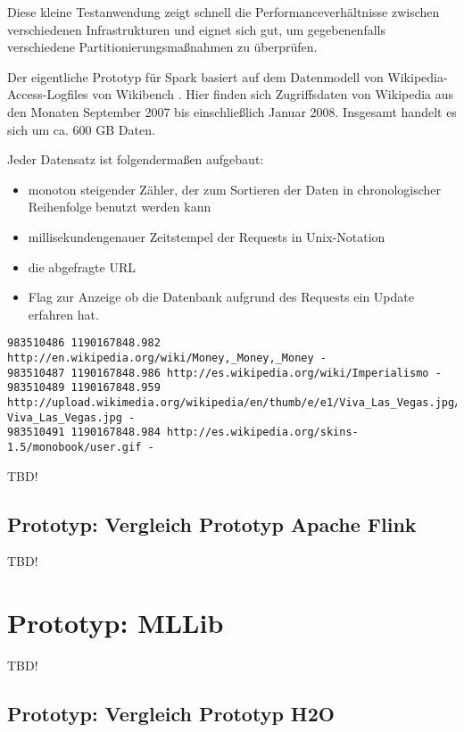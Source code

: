Diese kleine Testanwendung zeigt schnell die Performanceverhältnisse zwischen verschiedenen Infrastrukturen und eignet sich gut, um gegebenenfalls verschiedene Partitionierungsmaßnahmen zu überprüfen.  

Der eigentliche Prototyp für Spark basiert auf dem Datenmodell von Wikipedia-Access-Logfiles von Wikibench . Hier finden sich Zugriffsdaten von Wikipedia aus den Monaten September 2007 bis einschließlich Januar 2008. Insgesamt handelt es sich um ca. 600 GB Daten. 

Jeder Datensatz ist folgendermaßen aufgebaut:

\begin{itemize}
\item monoton steigender Zähler, der zum Sortieren der Daten in chronologischer Reihenfolge benutzt werden kann
\item millisekundengenauer Zeitstempel der Requests in Unix-Notation
\item die abgefragte URL
\item Flag zur Anzeige ob die Datenbank aufgrund des Requests ein Update erfahren hat. 
\end{itemize}

\begin{lstlisting}[label=vwikilogs,caption=Beispieleinträge der Wikipedia Access Logs.]
983510486 1190167848.982 http://en.wikipedia.org/wiki/Money,_Money,_Money -
983510487 1190167848.986 http://es.wikipedia.org/wiki/Imperialismo -
983510489 1190167848.959 http://upload.wikimedia.org/wikipedia/en/thumb/e/e1/Viva_Las_Vegas.jpg/180px-Viva_Las_Vegas.jpg -
983510491 1190167848.984 http://es.wikipedia.org/skins-1.5/monobook/user.gif -
\end{lstlisting}

TBD!

\subsection{Prototyp: Vergleich Prototyp Apache Flink }
\label{section:vergleich apache flink}

TBD!

\section{Prototyp: MLLib }
\label{section:prototyp mllib}

TBD!

\subsection{Prototyp: Vergleich Prototyp H2O }
\label{section:vergleich h2o}

